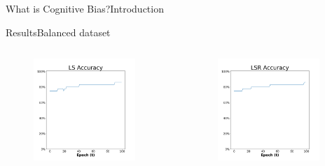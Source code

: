 \documentclass[
	aspectratio=169,	%
	onlytextwidth,		%
	t,					%
	]{beamer}
\begin{document}
\begin{frame}[fragile]{What is Cognitive Bias?}{Introduction}
\begin{frame}[fragile]{Results}{Balanced dataset}
\begin{columns}
				\begin{column}[T]{0.33\textwidth}
						\begin{figure}
					\includegraphics[width=0.9\textwidth]{myfigs/LS_b_res.png}
				\end{figure}
			\end{column}
		
			\begin{column}[T]{0.33\textwidth}
					\begin{figure}
					\includegraphics[width=0.9\textwidth]{myfigs/LSR_b_res.png}
				\end{figure}
			\end{column}
		

\end{columns}
\end{frame}
\end{frame}
\end{document}
